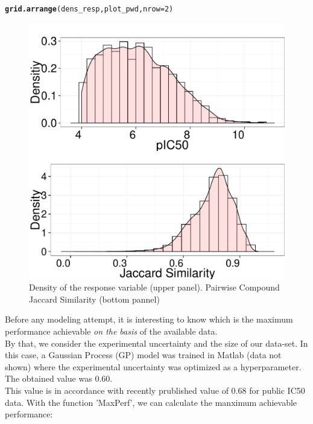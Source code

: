 \documentclass[twoside,a4wide,12pt]{article}\usepackage[]{graphicx}\usepackage[]{color}
\makeatletter
\def\maxwidth{ %
  \ifdim\Gin@nat@width>\linewidth
    \linewidth
  \else
    \Gin@nat@width
  \fi
}
\newcommand{\hlnum}[1]{\textcolor[rgb]{0.686,0.059,0.569}{#1}}%
\newcommand{\hlstd}[1]{\textcolor[rgb]{0.345,0.345,0.345}{#1}}%
\newcommand{\hlkwc}[1]{\textcolor[rgb]{0.333,0.667,0.333}{#1}}%
\newcommand{\hlkwd}[1]{\textcolor[rgb]{0.737,0.353,0.396}{\textbf{#1}}}%
\newenvironment{kframe}{%
 \def\at@end@of@kframe{}%
 \ifinner\ifhmode%
  \def\at@end@of@kframe{\end{minipage}}%
  \begin{minipage}{\columnwidth}%
 \fi\fi%
 \def\FrameCommand##1{\hskip\@totalleftmargin \hskip-\fboxsep
 \colorbox{shadecolor}{##1}\hskip-\fboxsep
     \hskip-\linewidth \hskip-\@totalleftmargin \hskip\columnwidth}%
 \MakeFramed {\advance\hsize-\width
   \@totalleftmargin\z@ \linewidth\hsize
   \@setminipage}}%
 {\par\unskip\endMakeFramed%
 \at@end@of@kframe}
\newenvironment{knitrout}{}{} %
\makeatother
\begin{document}
\begin{knitrout}
\color{fgcolor}\begin{kframe}
\begin{alltt}
\hlkwd{grid.arrange}\hlstd{(dens_resp, plot_pwd,} \hlkwc{nrow} \hlstd{=} \hlnum{2}\hlstd{)}
\end{alltt}
\end{kframe}\begin{figure}[]


{\centering \includegraphics[width=\maxwidth]{figure/unnamed-chunk-25} 

}

\caption[Density of the response variable (upper panel)]{Density of the response variable (upper panel). Pairwise Compound Jaccard Similarity (bottom pannel)\label{fig:unnamed-chunk-25}}
\end{figure}


\end{knitrout}


Before any modeling attempt, it is interesting to know which is the maximum performance achievable {\it on the basis} of the available data.\\ 
By that, we consider the experimental uncertainty and the size of our data-set. 
In this case, a Gaussian Process (GP) model was trained in Matlab (data not shown) where the experimental uncertainty was optimized as a hyperparameter. The obtained value was 0.60.\\
This value is in accordance with recently prublished value of 0.68 for public IC50 data.
With the function 'MaxPerf', we can calculate the manximum achievable performance:
\end{document}
